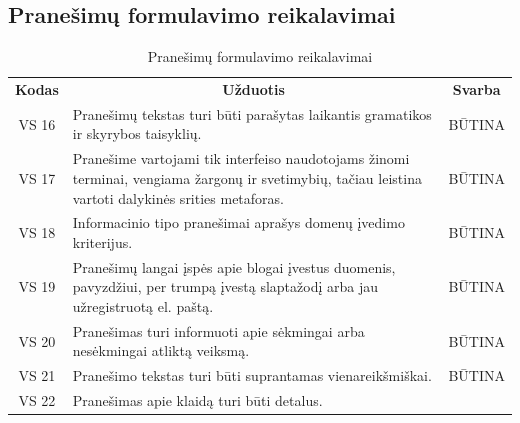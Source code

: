 \documentclass{VUMIFPSkursinis}
\begin{document}
{{{{{\begin{center}
\begin{table}[H]
\begin{tabular}{|p{2cm}|p{14cm}|p{2cm}|}
	\end{tabular}
	
	\label{table:4}
	\end{table}

\end{center}

\subsection{Pranešimų formulavimo reikalavimai}
\begin{center}
	\begin{table}[H]
	\caption{Pranešimų formulavimo reikalavimai}
	\begin{tabular}{|p{2cm}|p{11cm}|p{2cm}|}
	\hline
	    \rowcolor{lightgray}
	    \multicolumn{3}{|c|}{Pranešimų formulavimo reikalavimai}\\
	\hline
		\multicolumn{1}{|c|}{{\bfseries Kodas}}&
		\multicolumn{1}{|c|}{ {\bfseries Užduotis}}&
		\multicolumn{1}{|c|}{{\bfseries Svarba}}\\		
	\hline
		\multicolumn{1}{|c|}{VS 16}&
		\multicolumn{1}{|p{12,6cm}|}{Pranešimų tekstas turi būti parašytas laikantis gramatikos ir skyrybos taisyklių.}& 
		\multicolumn{1}{|c|}{BŪTINA}\\
	\hline
		\multicolumn{1}{|c|}{VS 17}&
		\multicolumn{1}{|p{12,5cm}|}{Pranešime vartojami tik interfeiso naudotojams žinomi terminai, vengiama žargonų ir svetimybių, tačiau leistina vartoti dalykinės srities metaforas.}& 
		\multicolumn{1}{|c|}{BŪTINA}\\
	\hline
		\multicolumn{1}{|c|}{VS 18}&
		\multicolumn{1}{|p{12,5cm}|}{Informacinio tipo pranešimai aprašys domenų įvedimo kriterijus.}& 
		\multicolumn{1}{|c|}{BŪTINA}\\
	\hline
		\multicolumn{1}{|c|}{VS 19}&
		\multicolumn{1}{|p{12,5cm}|}{Pranešimų langai įspės apie blogai įvestus duomenis, pavyzdžiui, per trumpą įvestą slaptažodį arba jau užregistruotą el. paštą.}& 
		\multicolumn{1}{|c|}{BŪTINA}\\
	\hline
		\multicolumn{1}{|c|}{VS 20}&
		\multicolumn{1}{|p{12,5cm}|}{Pranešimas turi informuoti apie sėkmingai arba nesėkmingai atliktą veiksmą.}& 
		\multicolumn{1}{|c|}{BŪTINA}\\
	\hline
		\multicolumn{1}{|c|}{VS 21}&
		\multicolumn{1}{|p{12,5cm}|}{Pranešimo tekstas turi būti suprantamas vienareikšmiškai.}& 
		\multicolumn{1}{|c|}{BŪTINA}\\
	\hline
		\multicolumn{1}{|c|}{VS 22}&
		\multicolumn{1}{|p{12,5cm}|}{Pranešimas apie klaidą turi būti detalus.}& 

\end{tabular}
\end{table}
\end{center}}}}}}
\end{document}
